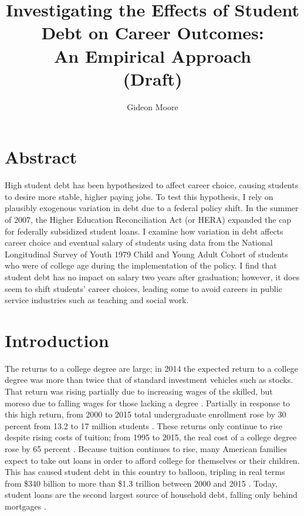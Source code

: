 \documentclass[12pt]{article}
\title{Investigating the Effects of Student Debt on Career Outcomes:\\ An Empirical Approach\\(Draft)}
\author{Gideon Moore}
\begin{document}
	{ \maketitle}
	
	
	\section*{Abstract}
	
	High student debt has been hypothesized to affect career choice, causing students to desire more stable, higher paying jobs. To test this hypothesis, I rely on plausibly exogenous variation in debt due to a federal policy shift. In the summer of 2007, the Higher Education Reconciliation Act (or HERA) expanded the cap for federally subsidized student loans. I examine how variation in debt affects career choice and eventual salary of students using data from the National Longitudinal Survey of Youth 1979 Child and Young Adult Cohort of students who were of college age during the implementation of the policy. I find that student debt has no impact on salary two years after graduation; however, it does seem to shift students' career choices, leading some to avoid careers in public service industries such as teaching and social work.
	
	\pagebreak
	
	\section{Introduction}
	
	The returns to a college degree are large; in 2014 the expected return to a college degree was more than twice that of standard investment vehicles such as stocks. That return was rising partially due to increasing wages of the skilled, but moreso due to falling wages for those lacking a degree \parencite{abel2014}. Partially in response to this high return, from 2000 to 2015 total undergraduate enrollment rose by 30 percent from 13.2 to 17 million students \parencite{mcfarland2017}. These returns only continue to rise despite rising costs of tuition; from 1995 to 2015, the real cost of a college degree rose by 65 percent \parencite{doe2016}. Because tuition continues to rise, many American families expect to take out loans in order to afford college for themselves or their children. This has caused student debt in this country to balloon, tripling in real terms from \$340 billion to more than \$1.3 trillion between 2000 and 2015 \parencite{feiveson2018}. Today, student loans are the second largest source of household debt, falling only behind mortgages \parencite{dynarski2015}. 
	
\end{document}
